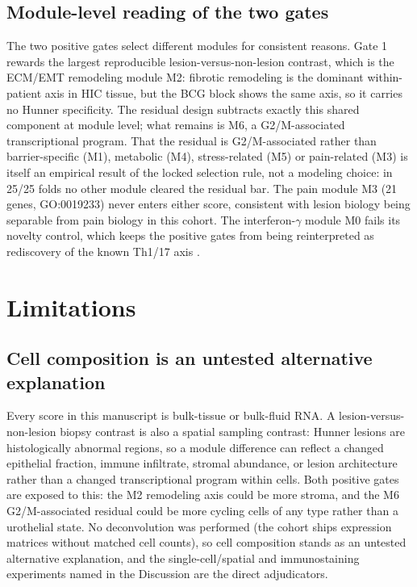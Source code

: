 \documentclass[11pt,a4paper]{article}
\begin{document}
\subsection{Module-level reading of the two gates}
The two positive gates select different modules for consistent reasons. Gate 1
rewards the largest reproducible lesion-versus-non-lesion contrast, which is
the ECM/EMT remodeling module M2: fibrotic remodeling is the dominant
within-patient axis in HIC tissue, but the BCG block shows the same axis, so it
carries no Hunner specificity. The residual design subtracts exactly this
shared component at module level; what remains is M6, a G2/M-associated
transcriptional program. That the residual is G2/M-associated rather than
barrier-specific (M1), metabolic (M4), stress-related (M5) or pain-related (M3)
is itself an empirical result of the locked selection rule, not a modeling
choice: in 25/25 folds no other module cleared the residual bar. The pain
module M3 (21 genes, GO:0019233) never enters either score, consistent with
lesion biology being separable from pain biology in this cohort. The
interferon-$\gamma$ module M0 fails its novelty control, which keeps the
positive gates from being reinterpreted as rediscovery of the known Th1/17
axis \cite{akiyama2023}.

\section{Limitations}
\subsection{Cell composition is an untested alternative explanation}
Every score in this manuscript is bulk-tissue or bulk-fluid RNA. A
lesion-versus-non-lesion biopsy contrast is also a spatial sampling contrast:
Hunner lesions are histologically abnormal regions, so a module difference can
reflect a changed epithelial fraction, immune infiltrate, stromal abundance,
or lesion architecture rather than a changed transcriptional program within
cells. Both positive gates are exposed to this: the M2 remodeling axis could
be more stroma, and the M6 G2/M-associated residual could be more cycling
cells of any type rather than a urothelial state. No deconvolution was
performed (the cohort ships expression matrices without matched cell counts),
so cell composition stands as an untested alternative explanation, and the
single-cell/spatial and immunostaining experiments named in the Discussion are
the direct adjudicators.
\end{document}
